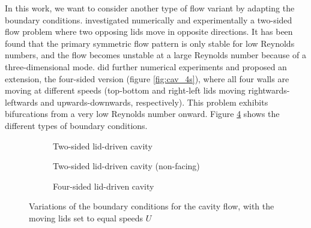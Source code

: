 In this work, we want to consider another type of flow variant by adapting the
boundary conditions. \cite{kuhlmann1997} investigated numerically and
experimentally a two-sided flow problem where two opposing lids move in
opposite directions. It has been found that the primary symmetric flow pattern
is only stable for low Reynolds numbers, and the flow becomes unstable at a
large Reynolds number because of a three-dimensional mode. \citep{wahba2009}
did further numerical experiments and proposed an extension, the four-sided
version (figure \ref{fig:cav_4s}), where all four walls are moving at different
speeds (top-bottom and right-left lids moving rightwards-leftwards and
upwards-downwards, respectively). This problem exhibits bifurcations from a
very low Reynolds number onward. Figure \ref{fig:bc_types} shows the different
types of boundary conditions.

\begin{figure}[ht]
\centering
\begin{subfigure}[b]{0.3\textwidth}
  \centering
  \caption{Two-sided lid-driven cavity \\ \hspace{\textwidth}}
  \label{subfig:bc_2s}
\end{subfigure}
\begin{subfigure}[b]{0.3\textwidth}
  \centering
  \caption{Two-sided lid-driven cavity (non-facing)}
  \label{subfig:bc_2s_nf}
\end{subfigure}
\begin{subfigure}[b]{0.3\textwidth}
  \centering
  \caption{Four-sided lid-driven cavity \\ \hspace{\textwidth}}
  \label{subfig:bc_4s}
\end{subfigure}

\caption{Variations of the boundary conditions for the cavity flow,
 with  the moving lids set to equal speeds $U$}
\label{fig:bc_types}
\end{figure}

